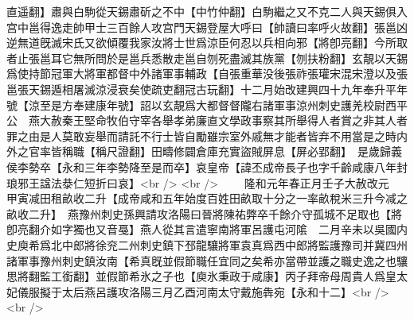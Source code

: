 直遥翻】肅與白駒從天錫肅斫之不中【中竹仲翻】白駒繼之又不克二人與天錫俱入宫中邕得逸走帥甲士三百餘人攻宫門天錫登屋大呼曰【帥讀曰率呼火故翻】張邕凶逆無道旣滅宋氏又欲傾覆我家汝將士世爲涼臣何忍以兵相向邪【將卽亮翻】今所取者止張邕耳它無所問於是邕兵悉散走邕自刎死盡滅其族黨【刎扶粉翻】玄靚以天錫爲使持節冠軍大將軍都督中外諸軍事輔政【自張重華没後張祚張瓘宋混宋澄以及張邕張天錫遁相屠滅涼浸衰矣使疏吏翻冠古玩翻】十二月始改建興四十九年奉升平年號【涼至是方奉建康年號】詔以玄靚爲大都督督隴右諸軍事涼州刺史護羌校尉西平公　燕大赦秦王堅命牧伯守宰各舉孝弟廉直文學政事察其所舉得人者賞之非其人者罪之由是人莫敢妄舉而請託不行士皆自勵雖宗室外戚無才能者皆弃不用當是之時内外之官率皆稱職【稱尺證翻】田疇修闢倉庫充實盜賊屏息【屏必郢翻】　是歲歸義侯李勢卒【永和三年李勢降至是而卒】哀皇帝【諱丕成帝長子也字千齡咸康八年封琅邪王諡法㳟仁短折曰哀】<br />
<br />
　　隆和元年春正月壬子大赦改元　甲寅减田租畝收二升【成帝咸和五年始度百姓田畝取十分之一率畝稅米三升今减之畝收二升】　燕豫州刺史孫興請攻洛陽曰晉將陳祐弊卒千餘介守孤城不足取也【將卽亮翻介如字獨也又音戞】燕人從其言遣寧南將軍呂護屯河隂　二月辛未以吳國内史庾希爲北中郎將徐兖二州刺史鎮下邳龍驤將軍袁真爲西中郎將監護豫司并冀四州諸軍事豫州刺史鎮汝南【希真旣並假節職任宜同之矣希亦當帶並護之職史逸之也驤思將翻監工銜翻】並假節希氷之子也【庾氷秉政于咸康】丙子拜帝母周貴人爲皇太妃儀服擬于太后燕呂護攻洛陽三月乙酉河南太守戴施犇宛【永和十二】<br />
<br />

